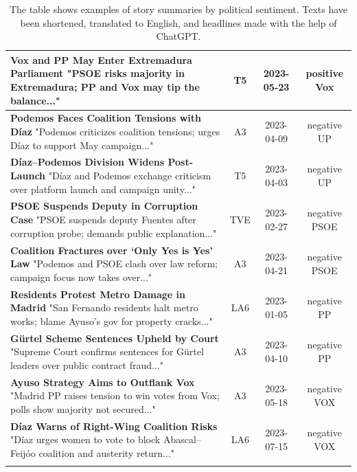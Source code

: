 \documentclass[12pt]{article}
\begin{document}
\begin{longtable}{|p{8cm}|c|c|c|}
		\hline
		\textbf{Vox and PP May Enter Extremadura Parliament} \newline
		"PSOE risks majority in Extremadura; PP and Vox may tip the balance..." & T5 & 2023-05-23 & positive Vox \\
		\hline
		\textbf{Podemos Faces Coalition Tensions with Díaz} \newline
		"Podemos criticizes coalition tensions; urges Díaz to support May campaign..." & A3 & 2023-04-09 & negative UP \\
		\hline
		\textbf{Díaz–Podemos Division Widens Post-Launch} \newline
		"Díaz and Podemos exchange criticism over platform launch and campaign unity..." & T5 & 2023-04-03 & negative UP \\
		\hline
		\textbf{PSOE Suspends Deputy in Corruption Case} \newline
		"PSOE suspends deputy Fuentes after corruption probe; demands public explanation..." & TVE & 2023-02-27 & negative PSOE \\
		\hline
		\textbf{Coalition Fractures over ‘Only Yes is Yes’ Law} \newline
		"Podemos and PSOE clash over law reform; campaign focus now takes over..." & A3 & 2023-04-21 & negative PSOE \\
		\hline
		\textbf{Residents Protest Metro Damage in Madrid} \newline
		"San Fernando residents halt metro works; blame Ayuso's gov for property cracks..." & LA6 & 2023-01-05 & negative PP \\
		\hline
		\textbf{Gürtel Scheme Sentences Upheld by Court} \newline
		"Supreme Court confirms sentences for Gürtel leaders over public contract fraud..." & A3 & 2023-04-10 & negative PP \\
		\hline
		\textbf{Ayuso Strategy Aims to Outflank Vox} \newline
		"Madrid PP raises tension to win votes from Vox; polls show majority not secured..." & A3 & 2023-05-18 & negative VOX \\
		\hline
		\textbf{Díaz Warns of Right-Wing Coalition Risks} \newline
		"Díaz urges women to vote to block Abascal–Feijóo coalition and austerity return..." & LA6 & 2023-07-15 & negative VOX \\
		\hline
		\caption{The table shows examples of story summaries by political sentiment. Texts have been shortened, translated to English, and headlines made with the help of ChatGPT.}
	\end{longtable}
	
\end{document}
